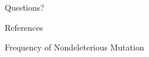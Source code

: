 
\begin{frame}[standout]
  Questions?
\end{frame}

\begin{frame}[allowframebreaks]{References}

  
  
\end{frame}

\begin{frame}{Frequency of Nondeleterious Mutation}

\end{frame}